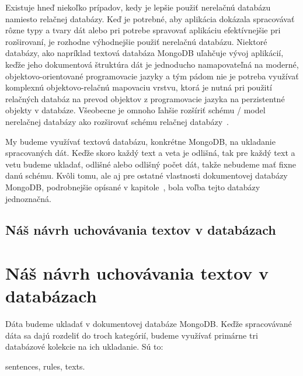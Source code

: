 Existuje hneď niekoľko prípadov, kedy je lepšie použiť nerelačnú databázu namiesto relačnej databázy. Keď je potrebné, aby aplikácia dokázala spracovávať rôzne typy a tvary dát alebo pri potrebe spravovať aplikáciu efektívnejšie pri rozširovaní, je rozhodne výhodnejšie použiť nerelačnú databázu. Niektoré databázy, ako napríklad textová databáza MongoDB uľahčuje vývoj aplikácií, keďže jeho dokumentová štruktúra dát je jednoducho namapovateľná na moderné, objektovo-orientované programovacie jazyky a tým pádom nie je potreba využívať komplexnú objektovo-relačnú mapovaciu vrstvu, ktorá je nutná pri použití relačných databáz na prevod objektov z programovacie jazyka na perzistentné objekty v databáze. Všeobecne je omnoho ľahšie rozšíriť schému / model nerelačnej databázy ako rozširovať schému relačnej databázy~\cite{MongoDBvsMySQLCompared}.

My budeme využívať textovú databázu, konkrétne MongoDB, na ukladanie spracovaných dát. Keďže skoro každý text a veta je odlišná, tak pre každý text a vetu budeme ukladať, odlišné alebo odlišný počet dát, takže nebudeme mať fixne danú schému. Kvôli tomu, ale aj pre ostatné vlastnosti dokumentovej databázy MongoDB, podrobnejšie opísané v kapitole~, bola voľba tejto databázy jednoznačná.

%
%
{
	\subsection{Náš návrh uchovávania textov v databázach}
}
{
	\section{Náš návrh uchovávania textov v databázach}
}
\label{subsection:our_design_persisting_data}
Dáta budeme ukladať v dokumentovej databáze MongoDB. Keďže spracovávané dáta sa dajú rozdeliť do troch kategórií, budeme využívať primárne tri databázové kolekcie na ich ukladanie. Sú to:

\begin{my_itemize}
	\myitem sentences,
	\myitem rules,
	\myitem texts.
\end{my_itemize}
	
